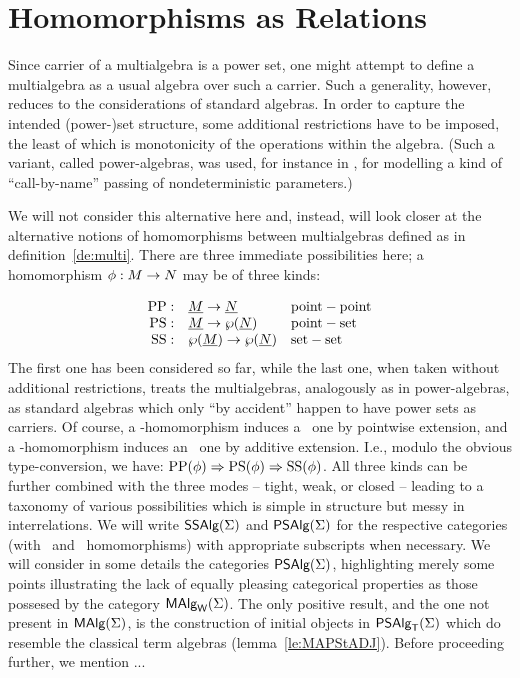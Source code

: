 \documentclass[10pt]{article}
\begin{document}


\section{Homomorphisms as Relations}
\label{se:horel}

Since carrier of a multialgebra is a power set, one might attempt to
define a multialgebra as a usual algebra over such a carrier.  Such a
generality, however, reduces to the considerations of standard
algebras. In order to capture the intended (power-)set structure, some
additional restrictions have to be imposed, the least of which is
monotonicity of the operations within the algebra. (Such a variant,
called power-algebras, was used, for instance in \cite{c:130}, for
modelling a kind of ``call-by-name'' passing of nondeterministic
parameters.)

We will not consider this alternative here and, instead, will look
closer at the alternative notions of homomorphisms between
multialgebras defined as in definition~\ref{de:multi}. There are three
immediate possibilities here; a homomorphism $\phi:M\rightarrow N$ may be of
three kinds:

\[ \begin{array}{rll}
{\rm PP}: & \underline {M} \rightarrow \underline {N} & {\rm point-point} \\
{\rm PS}: & \underline {M} \rightarrow \wp(\underline {N}) & {\rm point-set} \\
{\rm SS}:& \wp(\underline {M})\rightarrow \wp(\underline {N}) & {\rm set-set}
\end{array}
\]
%
The first one has been considered so far, while the last one, when
taken without additional restrictions, treats the multialgebras,
analogously as in power-algebras, as standard algebras which only ``by
accident'' happen to have power sets as carriers.  Of course, a
\PP-homomorphism induces a \PS\ one by pointwise extension, and a
\PS-homomorphism induces an \SSs\ one by additive extension.  I.e.,
modulo the obvious type-conversion, we have: ${\rm PP}(\phi) \Rightarrow
{\rm PS}(\phi) \Rightarrow {\rm SS}(\phi)$. All three kinds can be further
combined with the three modes -- tight, weak, or closed -- leading to
a taxonomy of various possibilities which is simple in structure but
messy in interrelations.  We will write $\mbox{\sf SSAlg}(\Sigma)$ and $\mbox{\sf PSAlg}(\Sigma)$ for the
respective categories (with \SSs\ and \PS\ homomorphisms) with
appropriate subscripts when necessary.  We will consider in some
details the categories $\mbox{\sf PSAlg}(\Sigma)$, highlighting merely some points
illustrating the lack of equally pleasing categorical properties as
those possesed by the category $\mbox{\rm\sf MAlg}_{\sf W}(\Sigma)$.  The only positive result, and
the one not present in $\mbox{\rm\sf MAlg}(\Sigma)$, is the construction of initial objects
in $\mbox{\sf PSAlg}_{\sf T}(\Sigma)$ which do resemble the classical term algebras
(lemma~\ref{le:MAPStADJ}).  Before proceeding further, we mention ...
\end{document}
